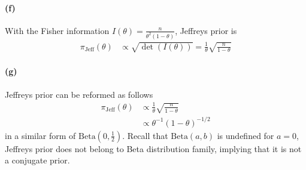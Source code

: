 \paragraph{(f)}
With the Fisher information $I(\theta) = \frac{n}{\theta^2(1-\theta)}$, Jeffreys prior is 
\begin{align*}
    \pi_{\mathrm{Jeff}}(\theta)
    &\propto \sqrt{\det (I(\theta))} = \frac{1}{\theta} \sqrt{\frac{n}{1-\theta}}
\end{align*}

\paragraph{(g)}
Jeffreys prior can be reformed as follows
\begin{align*}
    \pi_{\mathrm{Jeff}}(\theta)
    &\propto \frac{1}{\theta} \sqrt{\frac{n}{1-\theta}} \\
    &\propto \theta^{-1}(1-\theta)^{-1/2}
\end{align*}
in a similar form of $\mathrm{Beta}(0, \frac{1}{2})$. Recall that $\mathrm{Beta}(a, b)$ is undefined for $a=0$, Jeffreys prior does not belong to Beta distribution family, implying that it is not a conjugate prior. 
